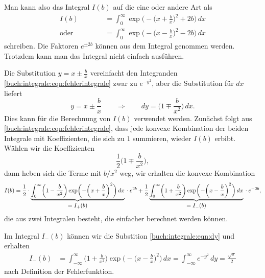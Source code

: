 Man kann also das Integral $I(b)$ auf die eine oder andere Art als
\begin{equation}
\begin{aligned}
I(b)
&=
\int_0^\infty \exp\biggl(-\biggl(x+\frac{b}{x}\biggr)^2+2b\biggr)\,dx
\\
\text{oder}\quad\phantom{I(b)}
&=
\int_0^\infty \exp\biggl(-\biggl(x-\frac{b}{x}\biggr)^2-2b\biggr)\,dx
\end{aligned}
\label{buch:integrale:eqn:fehlerintegrale}
\end{equation}
schreiben.
Die Faktoren $e^{\pm 2b}$ können aus dem Integral genommen werden.
Trotzdem kann man das Integral nicht einfach ausführen.

Die Substitution $y=x\pm\frac{b}{x}$ vereinfacht den Integranden
\eqref{buch:integrale:eqn:fehlerintegrale}
zwar zu $e^{-y^2}$, aber die Substitution für $dx$ liefert
\begin{equation}
y=x\pm\frac{b}{x}
\qquad\Rightarrow\qquad
dy = \biggl(1\mp \frac{b}{x^2}\biggr)\,dx.
\label{buch:integrale:eqn:dy}
\end{equation}
Dies kann für die Berechnung von $I(b)$ verwendet werden.
Zunächst folgt aus \eqref{buch:integrale:eqn:fehlerintegrale},
dass jede konvexe Kombination der beiden Integrale mit Koeffizienten,
die sich zu $1$ summieren, wieder $I(b)$ erbibt.
Wählen wir die Koeffizienten 
\[
\frac12\biggl(1\mp\frac{b}{x^2}\biggr),
\]
dann heben sich die Terme mit $b/x^2$ weg, wir erhalten die
konvexe Kombination
\[
I(b)
=
\frac12
\cdot
\underbrace{
\int_0^\infty
\biggl(1-\frac{b}{x^2}\biggr)
\exp\biggl(-\biggl(x+\frac{b}{x}\biggr)^2\biggr)\,dx
}_{\displaystyle=I_+(b)}
\mathstrut
\cdot e^{2b}
+
\frac12
\underbrace{
\int_0^\infty
\biggl(1+\frac{b}{x^2}\biggr)
\exp\biggl(-\biggl(x-\frac{b}{x}\biggr)^2\biggr)\,dx
}_{\displaystyle=I_-(b)}
\mathstrut
\cdot e^{-2b},
\]
die aus zwei Integralen besteht, die einfacher berechnet werden können.

Im Integral $I_-(b)$ können wir die Substition \eqref{buch:integrale:eqn:dy}
und erhalten
\begin{align*}
I_-(b)
&=
\int_{-\infty}^\infty
\biggl(1+\frac{b}{x^2}\biggr)
\exp\biggl(-\biggl(x-\frac{b}{x}\biggr)^2\biggr)\,dx
=
\int_{-\infty}^\infty e^{-y^2}\,dy
=
\frac{\sqrt{\pi}}2
\end{align*}
nach Definition der Fehlerfunktion.

